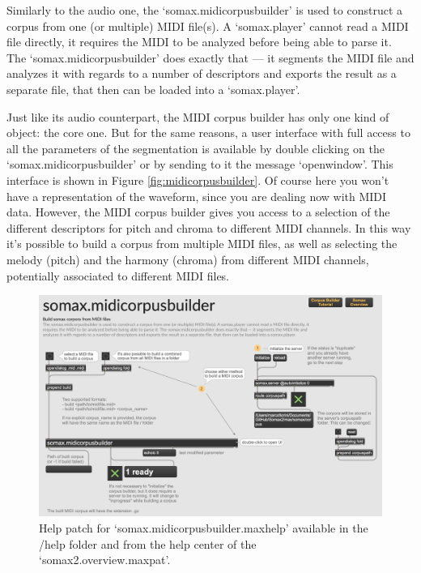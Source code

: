 Similarly to the audio one, the `somax.midicorpusbuilder' is used to construct a corpus from one (or multiple) MIDI file(s). A `somax.player' cannot read a MIDI file directly, it requires the MIDI to be analyzed before being able to parse it. The `somax.midicorpusbuilder' does exactly that — it segments the MIDI file and analyzes it with regards to a number of descriptors and exports the result as a separate file, that then can be loaded into a `somax.player'.

Just like its audio counterpart, the MIDI corpus builder has only one kind of object: the core one. But for the same reasons, a user interface with full access to all the parameters of the segmentation is available by double clicking on the `somax.midicorpusbuilder' or by sending to it the message `openwindow'. This interface is shown in Figure \ref{fig:midicorpusbuilder}. Of course here you won't have a representation of the waveform, since you are dealing now with MIDI data. However, the MIDI corpus builder gives you access to a selection of the different descriptors for pitch and chroma to different MIDI channels. In this way it's possible to build a corpus from multiple MIDI files, as well as selecting the melody (pitch) and the harmony (chroma) from different MIDI channels, potentially associated to different MIDI files.

\begin{figure}[H]
    \centering        
 	\includegraphics[width=1\textwidth, keepaspectratio]{img/midicorpusbuilder_help.png}
    \caption{Help patch for `somax.midicorpusbuilder.maxhelp' available in the /help folder and from the help center of the `somax2.overview.maxpat'.}
    \label{fig:midicorpusbuilder_help}
\end{figure}

